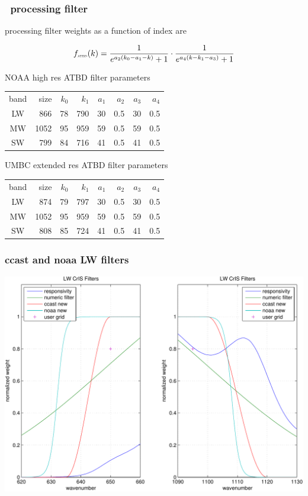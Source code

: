\documentclass[11pt]{beamer}
\begin{document}
\begin{frame}
\frametitle{\atbd\ processing filter}

{\atbd} processing filter weights as a function of index are

\[
  f_{\mbox{\tiny\textsc{atbd}}}(k) = \frac{1}{e^{a_2 (k_0-a_1-k)} + 1} \cdot
               \frac{1}{e^{a_4 (k-k_1-a_3)} + 1}
\]


\vspace{2mm}

NOAA high res ATBD filter parameters \\
\vspace{2mm}
\begin{tabular}{crrrrrrr}
band & size  & $k_0$ & $k_1$ & $a_1$ & $a_2$ & $a_3$ & $a_4$ \\
LW   &  866  &  78 &  790 &  30 &  0.5 &  30 &  0.5 \\
MW   & 1052  &  95 &  959 &  59 &  0.5 &  59 &  0.5 \\
SW   &  799  &  84 &  716 &  41 &  0.5 &  41 &  0.5
\end{tabular}

\vspace{4mm}
UMBC extended res ATBD filter parameters \\
\vspace{2mm}
\begin{tabular}{crrrrrrr}
band & size  & $k_0$ & $k_1$ & $a_1$ & $a_2$ & $a_3$ & $a_4$ \\
LW   &  874  &  79 &  797 &  30 &  0.5 &  30 &  0.5 \\
MW   & 1052  &  95 &  959 &  59 &  0.5 &  59 &  0.5 \\
SW   &  808  &  85 &  724 &  41 &  0.5 &  41 &  0.5
\end{tabular}

\end{frame}
\begin{frame}
\frametitle{ccast and noaa LW filters}
\begin{center}
  \includegraphics[scale=0.5]{figures/show_filts_LW.pdf}
\end{center}
\end{frame}
\end{document}
